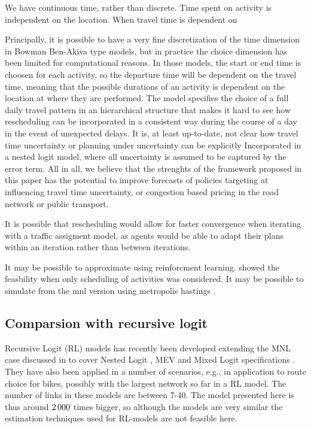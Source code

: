 We have continuous time, rather than discrete. Time spent on activity is independent on the location. When travel time is dependent on 

Principally, it is possible to have a very fine discretization of the time dimension in Bowman Ben-Akiva type models, but in practice the choice dimension has been limited for computational reasons. In those models, the start or end time is choosen for each activity, so the departure time will be dependent on the travel time, meaning that the possible durations of an activity is dependent on the location at where they are performed. The model specifies the choice of a full daily travel pattern in an hierarchical structure that makes it hard to see how rescheduling can be incorporated in a consistent way during the course of a day in the event of unexpected delays. It is, at least up-to-date, not clear how travel time uncertainty or planning under uncertainty can be explicitly Incorporated in a nested logit model, where all uncertainty is assumed to be captured by the error term. All in all, we believe that the strenghts of the framework proposed in this paper has the potential to improve forecasts of policies targeting at influencing travel time uncertainty, or congestion based pricing in the road network or public transport. 

It is possible that rescheduling would allow for faster convergence when iterating with a traffic assigment model, as agents would be able to adapt their plans within an iteration rather than between iterations. 


It may be possible to approximate using reinforcment learning. \citep{vanhusel09} showed the feasbility when only scheduling of activities was considered. It may be possible to simulate from the mnl version using metropolis hastings \citep{danalet}.

\subsection{Comparsion with recursive logit}
Recursive Logit (RL) models has recently been developed extending the MNL case discussed in \citet{fosgerau2013} to cover Nested Logit \citep{mai2015}, MEV \citep{mai2016method} and Mixed Logit specifications \citep{mai2016decomposition}. They have also been applied in a number of scenarios, e.g., in \cite{zimmermann2017bike}  application to route choice for bikes, possibly with the largest network so far in a RL model. The number of links in these models are between 7-40. The model presented here is thus around $2\, 000$ times bigger, so although the models are very similar the estimation techniques used for RL-models are not feasible here. 

